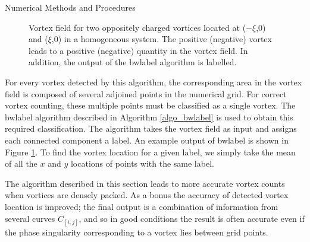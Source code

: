 \begin{chapter}{\label{cha:numerics}Numerical Methods and Procedures}
\begin{figure}
\begin{tikzpicture}
  \end{tikzpicture}
  \caption{Vortex field for two oppositely charged vortices located at ($-\xi$,0) and ($\xi$,0) in a homogeneous system. The positive (negative) vortex leads to a positive (negative) quantity in the vortex field. In addition, the output of the bwlabel algorithm is labelled.\label{fig:vortexfield}}
 \end{figure}

For every vortex detected by this algorithm, the corresponding area in the vortex field is composed of several adjoined points in the numerical grid. For correct vortex counting, these multiple points must be classified as a single vortex. The bwlabel algorithm described in Algorithm \ref{algo_bwlabel} is used to obtain this required classification. The algorithm takes the vortex field as input and assigns each connected component a label. An example output of bwlabel is shown in Figure \ref{fig:vortexfield}. To find the vortex location for a given label, we simply take the mean of all the $x$ and $y$ locations of points with the same label.

The algorithm described in this section leads to more accurate vortex counts when vortices are densely packed. As a bonus the accuracy of detected vortex location is improved; the final output is a combination of information from several curves $C_{[i,j]}$, and so in good conditions the result is often accurate even if the phase singularity corresponding to a vortex lies between grid points. 


\end{chapter}

